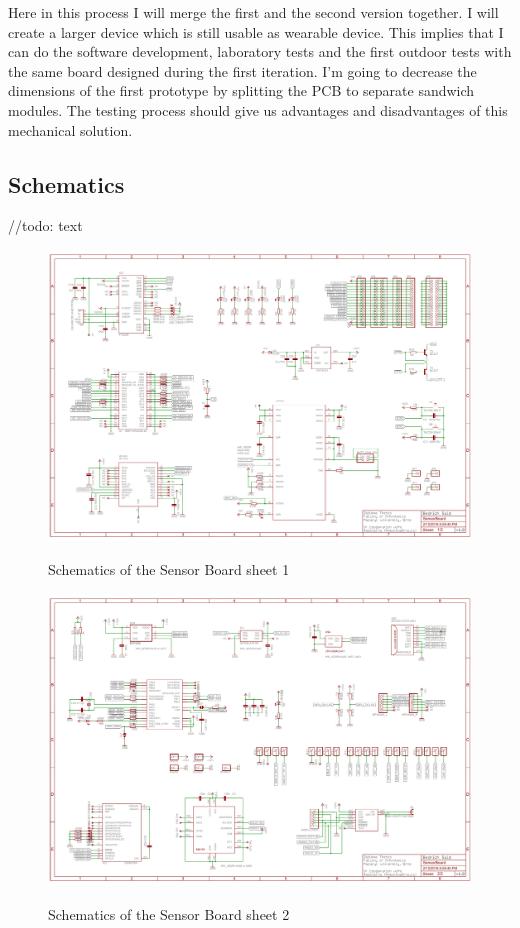 \documentclass[12pt,a4paper]{article}
\begin{document}
Here in this process I will merge the first and the second version together. I will create a larger device which is still usable as wearable device. This implies that I can do the software development, laboratory tests and the first outdoor tests with the same board designed during the first iteration. I'm going to decrease the dimensions of the first prototype by splitting the PCB to separate sandwich modules. The testing process should give us advantages and disadvantages of this mechanical solution.

\subsection{Schematics}
//todo: text

\begin{figure}
	\centering
	\includegraphics[angle=90, scale=1]{img/sch1.pdf}
	\label{sch1}
	\caption{Schematics of the Sensor Board sheet 1}
\end{figure}

\begin{figure}
	\centering
	\includegraphics[angle=90, scale=1]{img/sch2.pdf}
	\label{sch2}
	\caption{Schematics of the Sensor Board sheet 2}
\end{figure}
\end{document}
